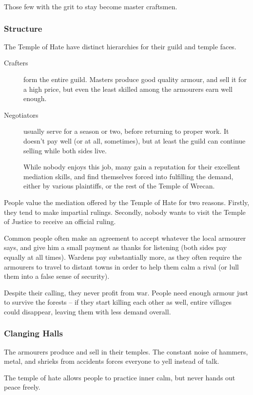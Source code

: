 \begin{multicols}{2}
Those few with the grit to stay become master craftsmen.

\subsubsection{Structure}
The Temple of Hate have distinct hierarchies for their guild and temple faces.

\begin{description}
  \item[Crafters]
  form the entire guild.
  Masters produce good quality armour, and sell it for a high price, but even the least skilled among the armourers earn well enough.
  \item[Negotiators]
  usually serve for a season or two, before returning to proper work.
  It doesn't pay well (or at all, sometimes), but at least the guild can continue selling while both sides live.

  While nobody enjoys this job, many gain a reputation for their excellent mediation skills, and find themselves forced into fulfilling the demand, either by various plaintiffs, or the rest of the Temple of Wrecan.
\end{description}

\noindent
People value the mediation offered by the Temple of Hate for two reasons.
Firstly, they tend to make impartial rulings.
Secondly, nobody wants to visit the Temple of Justice to receive an official ruling.

Common people often make an agreement to accept whatever the local armourer says, and give him a small payment as thanks for listening (both sides pay equally at all times).
Wardens pay substantially more, as they often require the armourers to travel to distant towns in order to help them calm a rival (or lull them into a false sense of security).

Despite their calling, they never profit from war.
People need enough armour just to survive the forests -- if they start killing each other as well, entire villages could disappear, leaving them with less demand overall.

\subsubsection{Clanging Halls}
The armourers produce and sell in their temples.
The constant noise of hammers, metal, and shrieks from accidents forces everyone to yell instead of talk.

The temple of hate allows people to practice inner calm, but never hands out peace freely.


\end{multicols}
